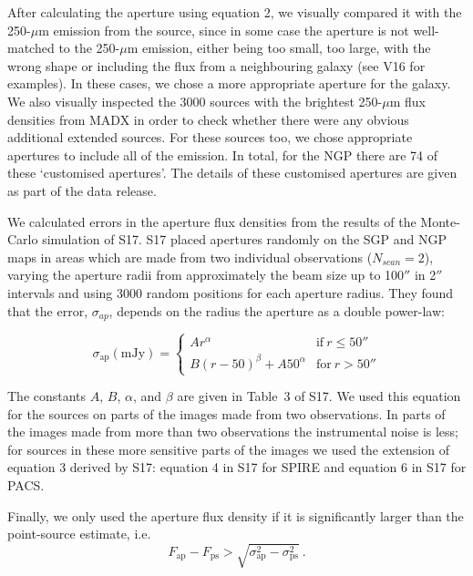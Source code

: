 \documentclass[useAMS,usenatbib]{mnras}
\begin{document}
After calculating the aperture using equation 2, we visually compared
it with the 250-$\mu$m emission from the source, since in some case
the aperture is not well-matched to the 250-$\mu$m emission, either
being too small, too large, with the wrong shape or including the flux
from a neighbouring galaxy (see V16 for examples).  In these cases, we
chose a more appropriate aperture for the galaxy.  We also visually
inspected the 3000 sources with the brightest 250-$\mu$m flux
densities from MADX in order to check whether there were any obvious
additional extended sources.  For these sources too, we chose
appropriate apertures to include all of the emission.  In total, for
the NGP there are 74 of these `customised apertures'.  The details of
these customised apertures are given as part of the data release.

We calculated errors in the aperture flux densities from the results
of the Monte-Carlo simulation of S17. S17 placed apertures randomly on
the SGP and NGP maps in areas which are made from two individual
observations ($N_{scan}=2$), varying the aperture radii from
approximately the beam size up to 100$''$ in 2$''$ intervals and using
3000 random positions for each aperture radius.  They found that the
error, $\sigma_{ap}$, depends on the radius the aperture as a double
power-law:

\begin{equation}
  \sigma_{\mathrm{ap}}(\mathrm{mJy}) =
  \begin{cases}
      Ar^\alpha &   \mathrm{if\ } r\le 50'' \\
      B(r-50)^\beta + A 50^\alpha & \mathrm{for\ } r>50''
    \end{cases}
\end{equation}

The constants $A$, $B$, $\alpha$, and $\beta$  are given in Table~3 of S17.
We used this equation for the sources on parts of the images made from two
observations. In parts of the images made from more than two observations
the instrumental noise is less; for sources in these more sensitive parts of
the images we used the extension of equation 3 derived by S17: equation
4 in S17 for SPIRE and equation 6 in S17 for PACS.

Finally, we only used the aperture flux density if
it is significantly larger than the point-source estimate, i.e.
\begin{equation}
F_\mathrm{ap}- F_\mathrm{ps}>\sqrt{\sigma_\mathrm{ap}^2-\sigma_\mathrm{ps}^2}
\ .
\end{equation}
\end{document}
